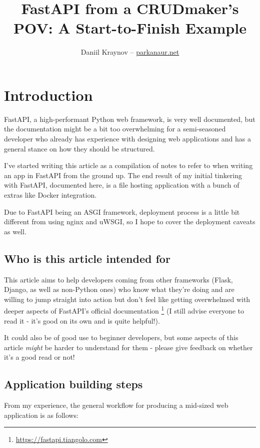 \documentclass[14pt]{extarticle}
\title{FastAPI from a CRUDmaker's POV: A Start-to-Finish Example}
\author{Daniil Kraynov -- \href{https://parkanaur.net}{parkanaur.net}}
\newcommand{\flink}[1]{\footnote{\href{#1}{#1}}}
\begin{document}
\maketitle

{\hypersetup{linkcolor=black}
\tableofcontents}

\section{Introduction}

FastAPI, a high-performant Python web framework, is very well documented, but the documentation might be a bit too overwhelming for a semi-seasoned developer who already has experience with designing web applications and has a general stance on how they should be structured.

I've started writing this article as a compilation of notes to refer to when writing an app in FastAPI from the ground up. The end result of my initial tinkering with FastAPI, documented here, is a file hosting application with a bunch of extras like Docker integration.

Due to FastAPI being an ASGI framework, deployment process is a little bit different from using nginx and uWSGI, so I hope to cover the deployment caveats as well.

\subsection{Who is this article intended for}

This article aims to help developers coming from other frameworks (Flask, Django, as well as non-Python ones) who know what they're doing and are willing to jump straight into action but don't feel like getting overwhelmed with deeper aspects of FastAPI's official documentation \flink{https://fastapi.tiangolo.com} (I still advise everyone to read it - it's good on its own and is quite helpful!).

It could also be of good use to beginner developers, but some aspects of this article \textit{might} be harder to understand for them - please give feedback on whether it's a good read or not!

\subsection{Application building steps}

From my experience, the general workflow for producing a mid-sized web application is as follows:
\end{document}
